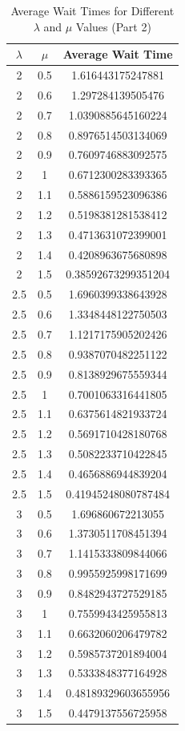 \documentclass[fleqn, a4paper. 12pt]{jsarticle}
\begin{document}
        \begin{table}[p]
        \centering
        \begin{tabular}{|c|c|c|}
        \hline
        $\lambda$ & $\mu$ & Average Wait Time \\
        \hline
        2 & 0.5 & 1.616443175247881 \\
        2 & 0.6 & 1.297284139505476 \\
        2 & 0.7 & 1.0390885645160224 \\
        2 & 0.8 & 0.8976514503134069 \\
        2 & 0.9 & 0.7609746883092575 \\
        2 & 1 & 0.6712300283393365 \\
        2 & 1.1 & 0.5886159523096386 \\
        2 & 1.2 & 0.5198381281538412 \\
        2 & 1.3 & 0.4713631072399001 \\
        2 & 1.4 & 0.4208963675680898 \\
        2 & 1.5 & 0.38592673299351204 \\
        2.5 & 0.5 & 1.6960399338643928 \\
        2.5 & 0.6 & 1.3348448122750503 \\
        2.5 & 0.7 & 1.1217175905202426 \\
        2.5 & 0.8 & 0.9387070482251122 \\
        2.5 & 0.9 & 0.8138929675559344 \\
        2.5 & 1 & 0.7001063316441805 \\
        2.5 & 1.1 & 0.6375614821933724 \\
        2.5 & 1.2 & 0.5691710428180768 \\
        2.5 & 1.3 & 0.5082233710422845 \\
        2.5 & 1.4 & 0.4656886944839204 \\
        2.5 & 1.5 & 0.41945248080787484 \\
        3 & 0.5 & 1.696860672213055 \\
        3 & 0.6 & 1.3730511708451394 \\
        3 & 0.7 & 1.1415333809844066 \\
        3 & 0.8 & 0.9955925998171699 \\
        3 & 0.9 & 0.8482943727529185 \\
        3 & 1 & 0.7559943425955813 \\
        3 & 1.1 & 0.6632060206479782 \\
        3 & 1.2 & 0.5985737201894004 \\
        3 & 1.3 & 0.5333848377164928 \\
        3 & 1.4 & 0.48189329603655956 \\
        3 & 1.5 & 0.4479137556725958 \\
        \hline
        \end{tabular}
        \caption{Average Wait Times for Different $\lambda$ and $\mu$ Values (Part 2)}
        \label{table:3}
        \end{table}
\end{document}
